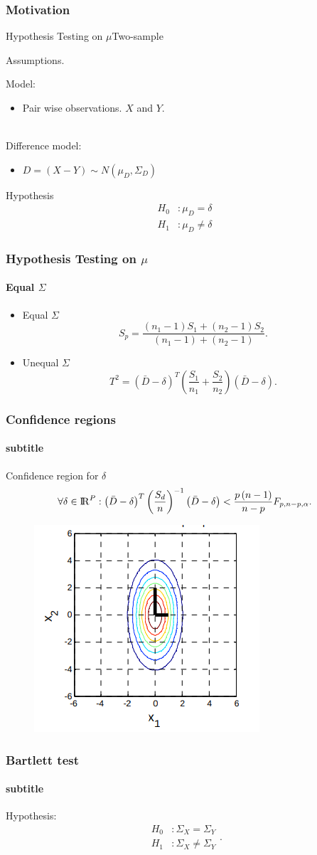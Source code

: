 \documentclass[aspectratio=169,10pt,t]{beamer}
\begin{document}
\begin{frame}[t]
    \frametitle{Motivation}
    
\end{frame}

\begin{frame}{Hypothesis Testing on $\mu$}{Two-sample}

	Assumptions.
	
	Model:
	\begin{itemize}
		\item Pair wise observations. $X$ and $Y$.
	\end{itemize}
	\\
	Difference model:
	\begin{itemize}
		\item 
			$ D =   \left( X - Y  \right)  \sim N \left( \mu_D, \Sigma_D  \right)  $
	\end{itemize}

	Hypothesis
	\begin{align*}
		H_0&: \mu_D = \delta\\
		H_1&: \mu_D \neq \delta
	\end{align*}

\end{frame}

\begin{frame}[t]
	\frametitle{Hypothesis Testing on $\mu$}
	\framesubtitle{Equal $\Sigma$}
	\begin{itemize}
		\item Equal $\Sigma$\\
			\[
			S_p = 
			\frac{  \left( n_1 -1  \right) S_1 +  \left( n_2 -1  \right) S_2}
			{ \left( n_1 -1  \right) +  \left( n_2 -1  \right) } 
			.\] 
		\item Unequal $\Sigma$
			\[
			T^{2} =
			\left( \bar{D} - \delta  \right) ^{T}
			\left( \frac{S_1}{n_1} + \frac{S_2}{n_2}  \right) 
			\left( \bar{D} - \delta  \right)
			.\] 
	\end{itemize}
\end{frame}
\begin{frame}[t]
	\frametitle{Confidence regions}
	\framesubtitle{subtitle}
	Confidence region for $\delta$
	\[
		\forall \delta \in {\rm I\!R}^{P}:
		\left( \bar{D} - \delta  \right) ^{T}
		\left( \frac{S_d}{n}  \right) ^{-1}
		\left( \bar{D} - \delta  \right)
		<
		\frac{p  \left( n-1 \right) }{n-p} 
		F_{p,n-p,\alpha}
	.\] 
	\begin{figure}[h]
		\centering
		\includegraphics[width=0.35\linewidth]{../01/images/1.png}
	\end{figure}
\end{frame}

\begin{frame}[t]
	\frametitle{Bartlett test}
	\framesubtitle{subtitle}
	Hypothesis:
	\[
		\begin{aligned}
			H_0 &: \Sigma_X = \Sigma_Y\\
			H_1 &: \Sigma_X \neq \Sigma_Y
		\end{aligned}
	.\] 
\end{frame}
\end{document}
